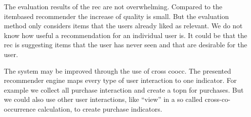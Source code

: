 The evaluation results of the \gls{rec} are not overwhelming. Compared to the \gls{itembased} recommender the increase of quality is small. But the evaluation method only considers items that the users already liked as relevant. We do not know how useful a recommendation for an individual user is. It could be that the \gls{rec} is suggesting items that the user has never seen and that are desirable for the user.

The system may be improved through the use of cross \gls{coocc}. The presented recommender engine maps every type of user interaction to one \gls{indicator}. For example we collect all purchase interaction and create a \gls{topn} for purchases. But we could also use other user interactions, like ``view'' in a so called cross-co-occurrence calculation, to create purchase indicators. 

